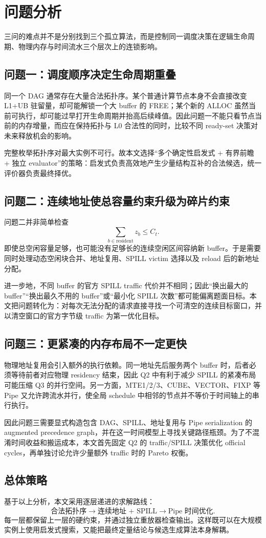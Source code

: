 \section{问题分析}

三问的难点并不是分别找到三个孤立算法，而是控制同一调度决策在逻辑生命周期、物理内存与时间流水三个层次上的连锁影响。

\subsection{问题一：调度顺序决定生命周期重叠}

同一个 DAG 通常存在大量合法拓扑序。某个普通计算节点本身不会直接改变 L1+UB 驻留量，却可能解锁一个大 buffer 的 FREE；某个新的 ALLOC 虽然当前可执行，却可能过早打开生命周期并抬高后续峰值。因此问题一不能只看节点当前的内存增量，而应在保持拓扑与 L0 合法性的同时，比较不同 ready-set 决策对未来释放机会的影响。

完整枚举拓扑序对最大实例不可行。故本文选择“多个确定性启发式 + 有界前瞻 + 独立 evaluator”的策略：启发式负责高效地产生少量结构互补的合法候选，统一评价器负责最终择优。

\subsection{问题二：连续地址使总容量约束升级为碎片约束}

问题二并非简单检查
\[
\sum_{b\in\mathrm{resident}}z_b\le C_t.
\]
即使总空闲容量足够，也可能没有足够长的连续空闲区间容纳新 buffer。于是需要同时处理动态空闲块合并、地址复用、SPILL victim 选择以及 reload 后的新地址分配。

进一步地，不同 buffer 的官方 SPILL traffic 代价并不相同；因此“换出最大的 buffer”“换出最久不用的 buffer”或“最小化 SPILL 次数”都可能偏离题面目标。本文把问题转化为：对每次无法分配的请求直接寻找一个可清空的连续目标窗口，并以清空窗口的官方字节级 traffic 为第一优化目标。

\subsection{问题三：更紧凑的内存布局不一定更快}

物理地址复用会引入额外的执行依赖。同一地址先后服务两个 buffer 时，后者必须等待前者对应物理 residency 结束，因此 Q2 中有利于减少 SPILL 的紧凑布局可能压缩 Q3 的并行空间。另一方面，MTE1/2/3、CUBE、VECTOR、FIXP 等 Pipe 又允许跨流水并行，使全局 schedule 中相邻的节点并不等价于时间轴上的串行执行。

因此问题三需要显式构造包含 DAG、SPILL、地址复用与 Pipe serialization 的 augmented precedence graph，并在这一时间模型上寻找关键路径瓶颈。为了不混淆时间收益和搬运成本，本文首先固定 Q2 的 traffic/SPILL 决策优化 official cycles，再单独讨论允许少量额外 traffic 时的 Pareto 权衡。

\subsection{总体策略}

基于以上分析，本文采用逐层递进的求解路线：
\[
\boxed{\text{合法拓扑序}}
\longrightarrow
\boxed{\text{连续地址 + SPILL}}
\longrightarrow
\boxed{\text{Pipe 时间优化}}.
\]
每一层都保留上一层的硬约束，并通过独立重放器检查输出。这样既可以在大规模实例上使用启发式搜索，又能把最终定量结论与候选生成算法本身解耦。